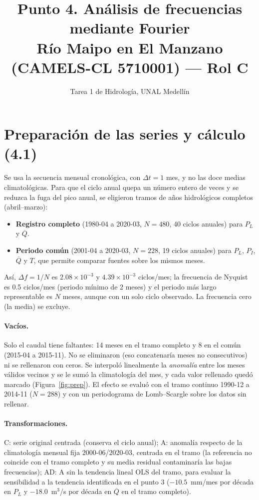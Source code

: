 \documentclass[11pt,letterpaper]{article}
\title{Punto 4. Análisis de frecuencias mediante Fourier\\
\large Río Maipo en El Manzano (CAMELS-CL 5710001) --- Rol C}
\author{Tarea 1 de Hidrología, UNAL Medellín}
\date{}
\begin{document}
\sloppy
\maketitle

\section{Preparación de las series y cálculo (4.1)}

Se usa la secuencia mensual cronológica, con $\Delta t=1$ mes, y no las doce medias climatológicas. Para que el
ciclo anual quepa un número entero de veces y se reduzca la fuga del pico anual, se eligieron tramos de años
hidrológicos completos (abril--marzo):

\begin{itemize}
\item \textbf{Registro completo} (1980-04 a 2020-03, $N=480$, 40 ciclos anuales) para $P_L$ y $\overline{Q}$.
\item \textbf{Periodo común} (2001-04 a 2020-03, $N=228$, 19 ciclos anuales) para $P_L$, $P_I$, $\overline{Q}$ y $T$,
que permite comparar fuentes sobre los mismos meses.
\end{itemize}

Así, $\Delta f=1/N$ es $2.08\times10^{-3}$ y $4.39\times10^{-3}$ ciclos/mes; la frecuencia de Nyquist es 0.5
ciclos/mes (periodo mínimo de 2 meses) y el periodo más largo representable es $N$ meses, aunque con un solo
ciclo observado. La frecuencia cero (la media) se excluye.

\paragraph{Vacíos.} Solo el caudal tiene faltantes: 14 meses en el tramo completo y 8 en el común
(2015-04 a 2015-11). No se eliminaron (eso concatenaría meses no consecutivos) ni se rellenaron con ceros. Se
interpoló linealmente la \emph{anomalía} entre los meses válidos vecinos y se le sumó la climatología del mes,
y cada valor rellenado quedó marcado (Figura~\ref{fig:prep}). El efecto se evaluó con el tramo continuo
1990-12 a 2014-11 ($N=288$) y con un periodograma de Lomb--Scargle \citep{Lomb1976,Scargle1982} sobre los
datos sin rellenar.

\paragraph{Transformaciones.} C: serie original centrada (conserva el ciclo anual); A: anomalía respecto de la
climatología mensual fija 2000-06/2020-03, centrada en el tramo (la referencia no coincide con el tramo
completo y su media residual contaminaría las bajas frecuencias); AD: A sin la tendencia lineal OLS del tramo,
para evaluar la sensibilidad a la tendencia identificada en el punto 3 ($-10.5$~mm/mes por década en $P_L$ y
$-18.0$~m$^3$/s por década en $\overline{Q}$ en el tramo completo).
\end{document}
